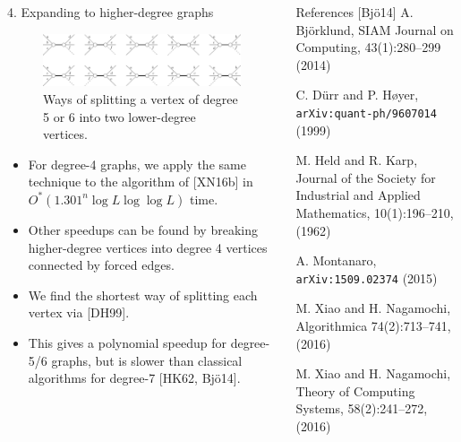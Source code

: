 \documentclass[]{templates/poster}
\begin{document}
\begin{frame}{}
  \begin{columns}[t]
  \begin{column}{0.422\linewidth}

  \begin{block}{\Large 4. Expanding to higher-degree graphs}
  \begin{figure}
  \includegraphics[width=\linewidth]{deg5}
  \caption{Ways of splitting a vertex of degree 5 or 6 into two lower-degree vertices.}
  \end{figure}

  \begin{itemize}
  \item For degree-4 graphs, we apply the same technique to the algorithm of [XN16b] in {\color{uobred}$O^*(1.301^n\log L \log\log L)$} time.
  
  \item Other speedups can be found by breaking higher-degree vertices into degree 4 vertices connected by forced edges.
  
  \item We find the shortest way of splitting each vertex via [DH99].

  \item This gives a polynomial speedup for degree-5/6 graphs, but is slower than classical algorithms for degree-7 [HK62, Bj\"o14].
  \end{itemize}
  \end{block}
  \end{column}

  \begin{column}{0.422\linewidth}
  \begin{block}{\Large References}
  [Bj\"o14] A. Bj{\"o}rklund, SIAM Journal on Computing, 43(1):280--299 (2014)

  \noindent[DH99] C. D\"urr and P. H\o yer, {\tt arXiv:quant-ph/9607014} (1999)

  \noindent[HK62] M. Held and R. Karp, Journal of the Society for Industrial and Applied Mathematics, 10(1):196--210, (1962)

  \noindent[Mon15] A. Montanaro, {\tt arXiv:1509.02374} (2015)

  \noindent[XN16a] M. Xiao and H. Nagamochi, Algorithmica 74(2):713--741, (2016)

  \noindent[XN16b] M. Xiao and H. Nagamochi, Theory of Computing Systems, 58(2):241--272, (2016)
  \end{block}
  \end{column}
\end{columns}

\end{frame}

\end{document}
